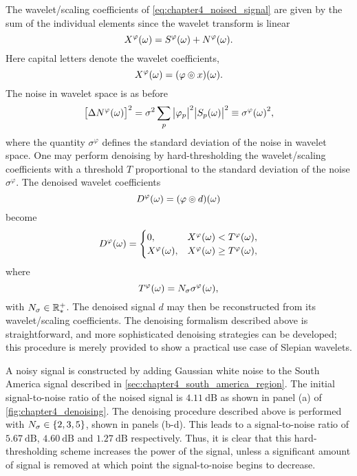 The wavelet/scaling coefficients of \cref{eq:chapter4_noised_signal} are given by the sum of the individual elements since the wavelet transform is linear
%
\begin{equation}
	X^{\varphi}(\omega)
	= S^{\varphi}(\omega) + N^{\varphi}(\omega).
\end{equation}
%
Here capital letters denote the wavelet coefficients, \ie{}
%
\begin{equation}
	X^{\varphi}(\omega) = (\varphi \circledcirc{} x)(\omega).
\end{equation}
%
The noise in wavelet space is as before
%
\begin{equation}
	{\big[\Delta N^{\varphi}(\omega)\big]}^{2}
	= \sigma^{2} \sum\limits_{p} \big\lvert{\varphi}_{p}\big\rvert^{2} \big\lvert{S}_{p}(\omega)\big\rvert^{2}
	\equiv {\sigma^{\varphi}(\omega)}^{2},
\end{equation}
%
where the quantity \(\sigma^{\varphi}\) defines the standard deviation of the noise in wavelet space.
One may perform denoising by hard-thresholding the wavelet/scaling coefficients with a threshold \(T\) proportional to the standard deviation of the noise \(\sigma^{\varphi}\).
The denoised wavelet coefficients
%
\begin{equation}
	D^{\varphi}(\omega) = (\varphi \circledcirc{} d)(\omega)
\end{equation}
%
become
%
\begin{equation}
	D^{\varphi}(\omega) =
	\begin{cases}
		0,
		 & X^{\varphi}(\omega) < T^{\varphi}(\omega),    \\
		X^{\varphi}(\omega),
		 & X^{\varphi}(\omega) \geq T^{\varphi}(\omega),
	\end{cases}
\end{equation}
%
where
%
\begin{equation}
	T^{\varphi}(\omega)
	= N_{\sigma}\sigma^{\varphi}(\omega),
\end{equation}
%
with \(N_{\sigma} \in \mathbb{R}_{\ast}^{+}{}\).
The denoised signal \(d\) may then be reconstructed from its wavelet/scaling coefficients.
The denoising formalism described above is straightforward, and more sophisticated denoising strategies can be developed; this procedure is merely provided to show a practical use case of Slepian wavelets.

A noisy signal is constructed by adding Gaussian white noise to the South America signal described in \cref{sec:chapter4_south_america_region}.
The initial signal-to-noise ratio of the noised signal is \(\SI{4.11}{\dB}\) as shown in panel (a) of \cref{fig:chapter4_denoising}.
The denoising procedure described above is performed with \(N_{\sigma} \in \{2, 3, 5\}\), shown in panels (b-d).
This leads to a signal-to-noise ratio of \(\SI{5.67}{\dB}\), \(\SI{4.60}{\dB}\) and \(\SI{1.27}{\dB}\) respectively.
Thus, it is clear that this hard-thresholding scheme increases the power of the signal, unless a significant amount of signal is removed at which point the signal-to-noise begins to decrease.

